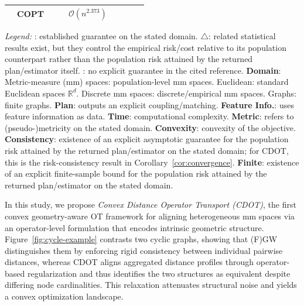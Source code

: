 \documentclass{article}
\theoremstyle{plain}
\theoremstyle{definition}
\theoremstyle{remark}
\newcommand{\cmark}{\ding{51}} %
\newcommand{\xmark}{\ding{55}} %
\begin{document}
\begin{table}[t]
\begin{tabular}{L{2.0cm} L{4.9cm} C{0.6cm} C{0.8cm} C{1.2cm} C{0.9cm} C{1.5cm} C{1.5cm} C{1.5cm}}
		& COPT \citep{dong2020copt}
		& \cmark & \xmark & $\mathcal{O}(n^{2.373})$
		& \cmark & \xmark & \xmark & \xmark \\
		
		\bottomrule
	\end{tabular}
	
	\vspace{4pt}
	\scriptsize
	\noindent\textit{Legend:}
	\cmark: established guarantee on the stated domain. 
		$\triangle$: related statistical results exist, but they control the empirical risk/cost relative to its population counterpart rather than the population risk attained by the returned plan/estimator itself. 
	\xmark: no explicit guarantee in the cited reference. 
	\textbf{Domain}:
	Metric-measure (mm) spaces: population-level mm spaces. 
	Euclidean: standard Euclidean spaces $\mathbb{R}^d$. 
	Discrete mm spaces: discrete/empirical mm spaces. 
	Graphs: finite graphs.
	\textbf{Plan}: outputs an explicit coupling/matching. 
	\textbf{Feature Info.}: uses feature information as data. 
	\textbf{Time}: computational complexity. 
	\textbf{Metric}: refers to (pseudo-)metricity on the stated domain. 
	\textbf{Convexity}: convexity of the objective. 
		\textbf{Consistency}: existence of an explicit asymptotic guarantee for the population risk attained by the returned plan/estimator on the stated domain; for CDOT, this is the risk-consistency result in Corollary~\ref{cor:convergence}. 
		\textbf{Finite}: existence of an explicit finite-sample bound for the population risk attained by the returned plan/estimator on the stated domain.\vspace{-4mm}
\end{table}

In this study, we propose \emph{Convex Distance Operator Transport (CDOT)}, the first convex geometry-aware OT framework for aligning heterogeneous mm spaces via an operator-level formulation that encodes intrinsic geometric structure. Figure~\ref{fig:cycle-example} contrasts two cyclic graphs, showing that (F)GW distinguishes them by enforcing rigid consistency between individual pairwise distances, whereas CDOT aligns aggregated distance profiles through operator-based regularization and thus identifies the two structures as equivalent despite differing node cardinalities. This relaxation attenuates structural noise and yields a convex optimization landscape.
\end{document}
